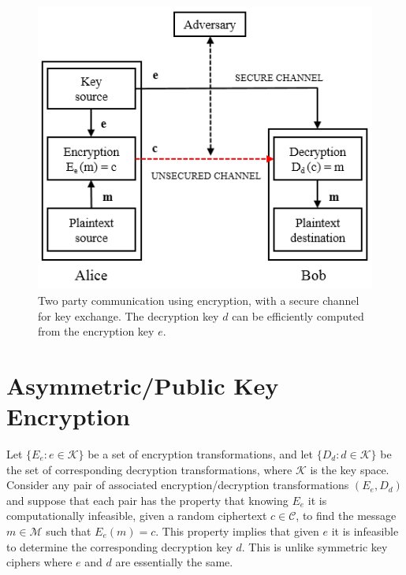 	\begin{figure}[h!]
	 	\centering
	 	\includegraphics{images/symmetric-key.png}
	 	\caption{Two party communication using encryption, with a secure channel for key exchange. The decryption key $d$ can be efficiently computed from the encryption key $e$. }
	 	\label{fig:symmetric-key}
	 \end{figure} 

\section{Asymmetric/Public Key Encryption}
	Let $\{E_{e}: e \in \mathcal{K}\}$ be a set of encryption transformations, and let $\{D_{d}: d \in \mathcal{K}\}$ be the set of corresponding decryption transformations, where $\mathcal{K}$ is the key space.
	Consider any pair of associated encryption/decryption transformations $(E_{e},D_{d})$ and suppose that each pair has the property that knowing $E_{e}$ it is computationally infeasible, given a random ciphertext $c \in \mathcal{C}$, to find the message $m \in \mathcal{M}$ such that $E_{e}(m) = c$.
	This property implies that given $e$ it is infeasible to determine the corresponding decryption key $d$.
	This is unlike symmetric key ciphers where $e$ and $d$ are essentially the same\cite{menezes2010handbook}.

